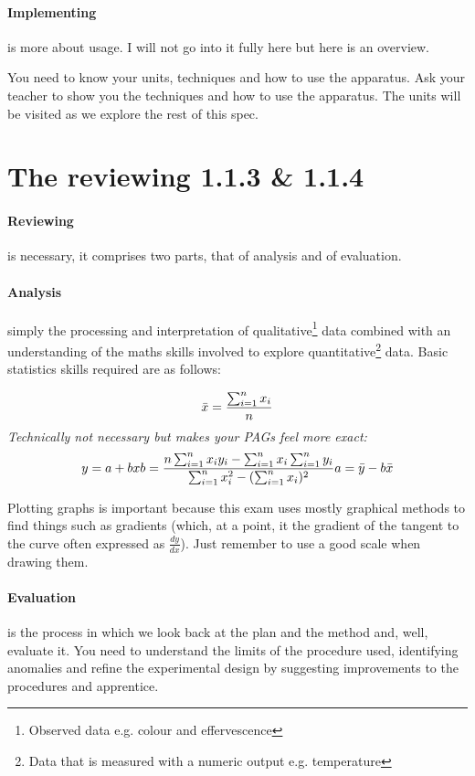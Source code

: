 	\paragraph{Implementing} is more about usage.
	I will not go into it fully here but here is an overview.
	
	You need to know your units, techniques and how to use the apparatus.
	Ask your teacher to show you the techniques and how to use the apparatus.
	The units will be visited as we explore the rest of this spec.
	
\section{The reviewing 1.1.3 \& 1.1.4}
	
	\paragraph{Reviewing} is necessary, it comprises two parts, that of analysis and of evaluation.
	
	\paragraph{Analysis} simply the processing and interpretation of qualitative\footnote{Observed data e.g. colour and effervescence} data combined with an understanding of the maths skills involved to explore quantitative\footnote{Data that is measured with a numeric output e.g. temperature} data.
	Basic statistics skills required are as follows:
	
	\begin{center}
		\begin{equation}
		\bar{x} = \frac{\sum_{i=1}^n x_i}{n}
		\end{equation}
		\textit{Technically not necessary but makes your PAGs feel more exact:}
		\begin{equation}
		y=a + bx \newline
		b=\frac{n\sum_{i=1}^n x_iy_i - \sum_{i=1}^n x_i \sum_{i=1}^n y_i}{\sum_{i=1}^n x^2_i -(\sum_{i=1}^n x_i)^2} \newline
		a = \mean{y} - b\mean{x}
		\end{equation}
	\end{center}
	
	Plotting graphs is important because this exam uses mostly graphical methods to find things such as gradients (which, at a point, it the gradient of the tangent to the curve often expressed as $\frac{dy}{dx}$).
	Just remember to use a good scale when drawing them.
	
	\paragraph{Evaluation} is the process in which we look back at the plan and the method and, well, evaluate it.
	You need to understand the limits of the procedure used, identifying anomalies and refine the experimental design by suggesting improvements to the procedures and apprentice.